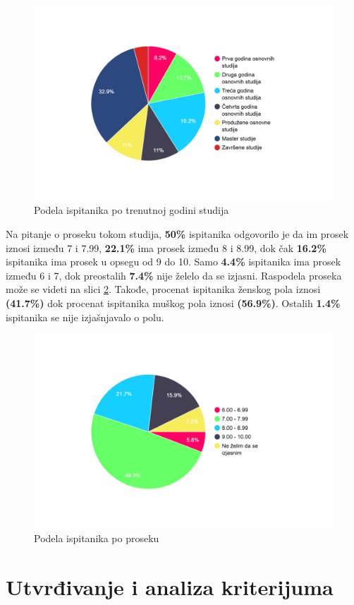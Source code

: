 \documentclass[a4paper]{article}
\begin{document}
\begin{figure}[H]
    \centering
    \includegraphics[width=0.7\linewidth]{Slike/PieChartGodinaStudiranja.png}
    \caption{Podela ispitanika po trenutnoj godini studija}
    \label{fig:raspodela_godine}
\end{figure}


Na pitanje o proseku tokom studija, \textbf{50\%} ispitanika odgovorilo je da im prosek iznosi između 7 i 7.99, \textbf{22.1\%} ima prosek između 8 i 8.99, dok čak \textbf{16.2\%} ispitanika ima prosek u opsegu od 9 do 10. Samo \textbf{4.4\%} ispitanika ima prosek između 6 i 7, dok preostalih \textbf{7.4\%} nije želelo da se izjasni. Raspodela proseka može se videti na slici \ref{fig:raspodela_prosek}. Takođe, procenat ispitanika ženskog pola iznosi \textbf{(41.7\%)} dok procenat ispitanika muškog pola iznosi \textbf{(56.9\%)}. Ostalih \textbf{1.4\%} ispitanika se nije izjašnjavalo o polu.

\begin{figure}[H]
    \centering
    \includegraphics[width=0.7\linewidth]{Slike/PieChartProsek.png}
    \caption{Podela ispitanika po proseku}
    \label{fig:raspodela_prosek}
\end{figure}

\section{Utvrđivanje i analiza kriterijuma}
\label{sec:stavovi}
\end{document}
